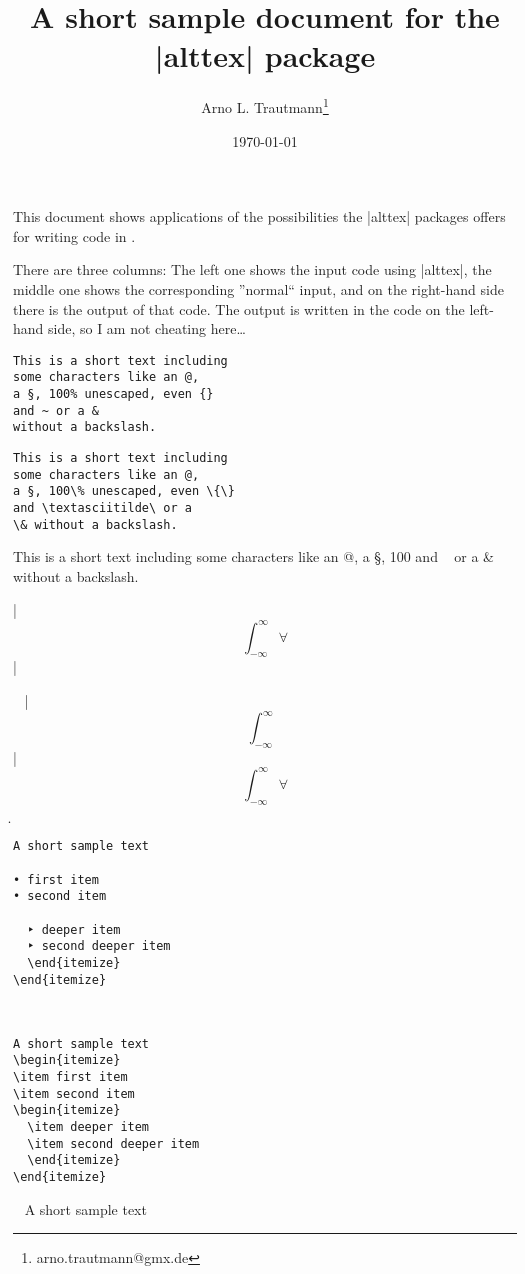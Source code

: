 \documentclass{article}
\title{A short sample document for the |alttex| package}
\author{Arno L. Trautmann\thanks{arno.trautmann@gmx.de}}
\date{\today}
\begin{document}
\maketitle
This document shows applications of the possibilities the |alttex| packages offers for writing code in \XeLaTeX.

There are three columns: The left one shows the input code using |alttex|, the middle one shows the corresponding ”normal“ input, and on the right-hand side there is the output of that code. The output is written in the code on the left-hand side, so I am not cheating here…\vspace{2cm}

\noescape
\begin{verbatim}
This is a short text including
some characters like an @,
a §, 100% unescaped, even {}
and ~ or a &
without a backslash.
\end{verbatim}
\vfill
\oldescape
\begin{verbatim}
This is a short text including
some characters like an @,
a §, 100\% unescaped, even \{\}
and \textasciitilde\ or a
\& without a backslash.
\end{verbatim}
\vfill
\noescape
This is a short text including
some characters like an @,
a §, 100%
and ~ or a &
without a backslash.
\oldescape
\endsample
\makealtmath

|\[∫_{-∞}^∞ ∀\]|

\ \vfill
|\[\int_{-\infty}^\infty\]|
\ \vfill
\[∫_{-∞}^∞ ∀\]\d
\endsample

\begin{verbatim}
A short sample text

• first item
• second item

  ‣ deeper item
  ‣ second deeper item
  \end{itemize}
\end{itemize}
\end{verbatim}
\ \vfill
\begin{verbatim}
A short sample text
\begin{itemize}
\item first item
\item second item
\begin{itemize}
  \item deeper item
  \item second deeper item
  \end{itemize}
\end{itemize}
\end{verbatim}
\ \vfill
A short sample text
\end{document}

